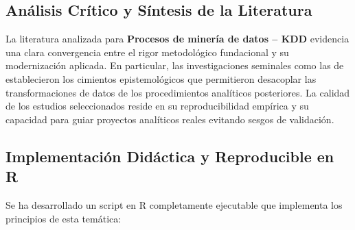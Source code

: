 \subsection{Análisis Crítico y Síntesis de la Literatura}
La literatura analizada para \textbf{Procesos de minería de datos – KDD} evidencia una clara convergencia entre el rigor metodológico fundacional y su modernización aplicada. 
En particular, las investigaciones seminales como las de \citeauthor{usama} establecieron los cimientos epistemológicos que permitieron desacoplar las transformaciones de datos de los procedimientos analíticos posteriores. 
La calidad de los estudios seleccionados reside en su reproducibilidad empírica y su capacidad para guiar proyectos analíticos reales evitando sesgos de validación.


\subsection{Implementación Didáctica y Reproducible en R}
Se ha desarrollado un script en R completamente ejecutable que implementa los principios de esta temática:
